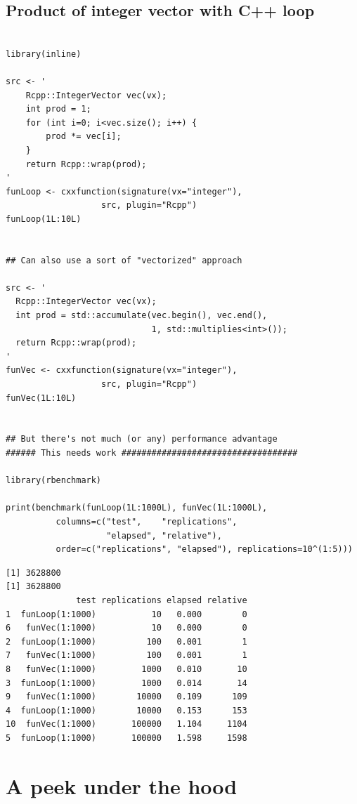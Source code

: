 \documentclass[11pt]{article}
\begin{document}
\subsection{Product of integer vector with C++ loop}
\label{sec-3-3}



\begin{verbatim}

library(inline)

src <- '
    Rcpp::IntegerVector vec(vx);
    int prod = 1;
    for (int i=0; i<vec.size(); i++) {
        prod *= vec[i];
    }
    return Rcpp::wrap(prod);
'
funLoop <- cxxfunction(signature(vx="integer"),
                   src, plugin="Rcpp")
funLoop(1L:10L)


## Can also use a sort of "vectorized" approach

src <- '
  Rcpp::IntegerVector vec(vx);
  int prod = std::accumulate(vec.begin(), vec.end(),
                             1, std::multiplies<int>());
  return Rcpp::wrap(prod);
'
funVec <- cxxfunction(signature(vx="integer"),
                   src, plugin="Rcpp")
funVec(1L:10L)


## But there's not much (or any) performance advantage
###### This needs work ###################################

library(rbenchmark)

print(benchmark(funLoop(1L:1000L), funVec(1L:1000L),
          columns=c("test",    "replications",
                    "elapsed", "relative"),
          order=c("replications", "elapsed"), replications=10^(1:5)))
\end{verbatim}


\begin{verbatim}
[1] 3628800
[1] 3628800
              test replications elapsed relative
1  funLoop(1:1000)           10   0.000        0
6   funVec(1:1000)           10   0.000        0
2  funLoop(1:1000)          100   0.001        1
7   funVec(1:1000)          100   0.001        1
8   funVec(1:1000)         1000   0.010       10
3  funLoop(1:1000)         1000   0.014       14
9   funVec(1:1000)        10000   0.109      109
4  funLoop(1:1000)        10000   0.153      153
10  funVec(1:1000)       100000   1.104     1104
5  funLoop(1:1000)       100000   1.598     1598
\end{verbatim}
\section{A peek under the hood}
\label{sec-4}
\end{document}
